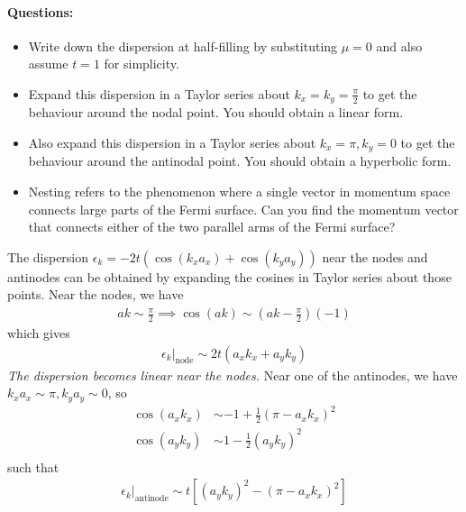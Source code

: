 \documentclass[12pt]{article}
\numberwithin{equation}{section}
\begin{document}
\paragraph{Questions:}
\begin{itemize}
	\item Write down the dispersion at half-filling by substituting \(\mu=0\) and also assume \(t=1\) for simplicity. 
	\item Expand this dispersion in a Taylor series  about \(k_x = k_y = \frac{\pi}{2}\) to get the behaviour around the nodal point. You should obtain a linear form.
	\item Also expand this dispersion in a Taylor series  about \(k_x = \pi, k_y = 0\) to get the behaviour around the antinodal point. You should obtain a hyperbolic form.
	\item Nesting refers to the phenomenon where a single vector in momentum space connects large parts of the Fermi surface. Can you find the momentum vector that connects either of the two parallel arms of the Fermi surface?
\end{itemize}
\newpage
The dispersion \(\epsilon_k = -2t\left(\cos(k_x a_x) + \cos(k_y a_y)\right)\) near the nodes and antinodes can be obtained by expanding the cosines in Taylor series about those points. Near the nodes, we have
\begin{equation}\begin{aligned}
	ak \sim \frac{\pi}{2} \implies \cos(ak) \sim \left(ak - \frac{\pi}{2}\right)(-1)
\end{aligned}\end{equation}
which gives
\begin{equation}\begin{aligned}
	\epsilon_k \vert_\text{node} \sim 2t \left(a_x k_x + a_y k_y\right)
\end{aligned}\end{equation}
\textit{The dispersion becomes linear near the nodes.} Near one of the antinodes, we have \(k_x a_x \sim \pi, k_y a_y \sim 0\), so
\begin{equation}\begin{aligned}
	\cos (a_x k_x) &\sim -1 + \frac{1}{2}\left( \pi - a_x k_x \right)^2\\
	\cos (a_y k_y) &\sim 1 - \frac{1}{2}\left(a_y k_y \right)^2\\
\end{aligned}\end{equation}
such that
\begin{equation}\begin{aligned}
	\epsilon_k \vert_\text{antinode} \sim t \left[\left(a_y k_y \right)^2 - \left( \pi - a_x k_x \right)^2\right]
\end{aligned}\end{equation}
\end{document}
